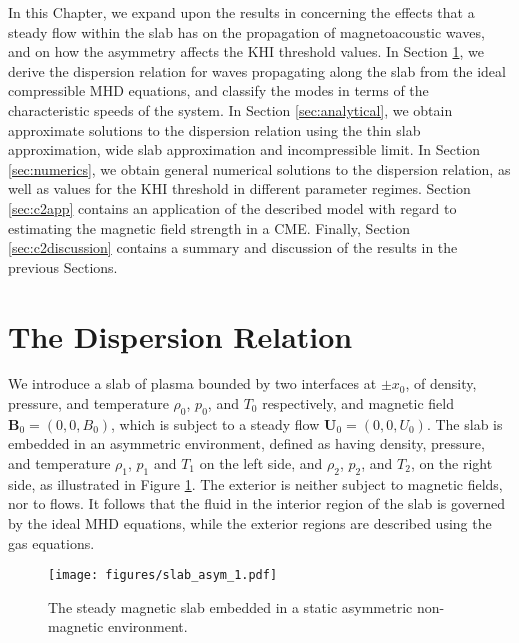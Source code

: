 \documentclass[12pt]{ociamthesis}
\begin{document}
In this Chapter, we expand upon the results in \cite{Barbulescu2018} concerning the effects that a steady flow within the slab has on the propagation of magnetoacoustic waves, and on how the asymmetry affects the KHI threshold values.
In Section \ref{sec:disprelslab}, we derive the dispersion relation for waves propagating along the slab from the ideal compressible MHD equations, and classify the modes in terms of the characteristic speeds of the system.
In Section \ref{sec:analytical}, we obtain approximate solutions to the dispersion relation using the thin slab approximation, wide slab approximation and incompressible limit.
In Section \ref{sec:numerics}, we obtain general numerical solutions to the dispersion relation, as well as values for the KHI threshold in different parameter regimes.
Section \ref{sec:c2app} contains an application of the described model with regard to estimating the magnetic field strength in a CME.
Finally, Section \ref{sec:c2discussion} contains a summary and discussion of the results in the previous Sections.



\section{The Dispersion Relation}
\label{sec:disprelslab}

We introduce a slab of plasma bounded by two interfaces at $\pm x_0$, of density, pressure, and temperature $\rho_0$, $p_0$, and $T_0$ respectively, and magnetic field $\mathbf{B}_0 = (0, 0, B_0)$, which is subject to a steady flow $\mathbf{U}_0 = (0, 0, U_0)$.
The slab is embedded in an asymmetric environment, defined as having density, pressure, and temperature $\rho_1$, $p_1$ and $T_1$ on the left side, and $\rho_2$, $p_2$, and $T_2$, on the right side, as illustrated in Figure \ref{slab}.
The exterior is neither subject to magnetic fields, nor to flows.
It follows that the fluid in the interior region of the slab is governed by the ideal MHD equations, while the exterior regions are described using the gas equations.

%
\begin{figure}[ht]
\centering
 \texttt{[image: figures/slab\_asym\_1.pdf]}
 \caption{The steady magnetic slab embedded in a static asymmetric non-magnetic environment.}
 \label{slab}
\end{figure}
%
\end{document}
